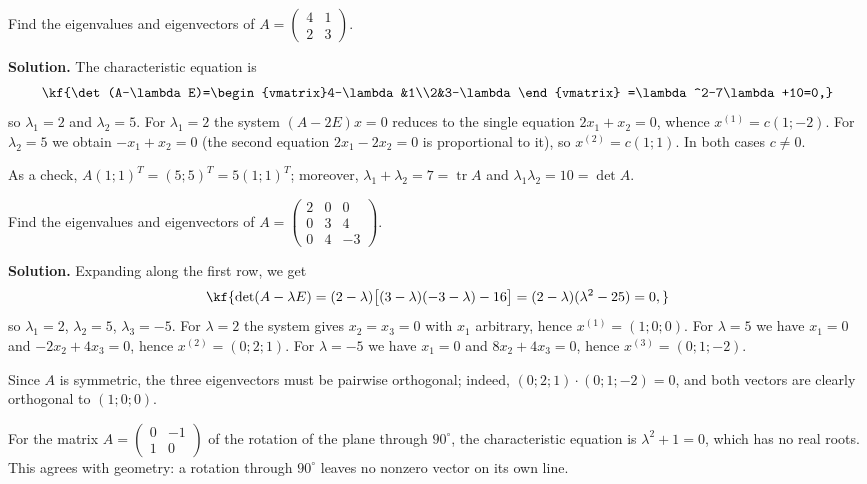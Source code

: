 \begin{misol}
Find the eigenvalues and eigenvectors of
$A=\begin{pmatrix}4&1\\2&3\end{pmatrix}$.

\textbf{Solution.} The characteristic equation is
\[\kf{\det(A-\lambda E)=\begin{vmatrix}4-\lambda&1\\2&3-\lambda\end{vmatrix}
=\lambda^2-7\lambda+10=0,}\]
so $\lambda_1=2$ and $\lambda_2=5$. For $\lambda_1=2$ the system
$(A-2E)x=0$ reduces to the single equation $2x_1+x_2=0$, whence
$x^{(1)}=c(1;-2)$. For $\lambda_2=5$ we obtain $-x_1+x_2=0$ (the second
equation $2x_1-2x_2=0$ is proportional to it), so $x^{(2)}=c(1;1)$. In
both cases $c\neq0$.

As a check, $A(1;1)^T=(5;5)^T=5(1;1)^T$; moreover,
$\lambda_1+\lambda_2=7=\operatorname{tr}A$ and
$\lambda_1\lambda_2=10=\det A$.
\end{misol}

\begin{misol}
Find the eigenvalues and eigenvectors of
$A=\begin{pmatrix}2&0&0\\0&3&4\\0&4&-3\end{pmatrix}$.

\textbf{Solution.} Expanding along the first row, we get
\[\kf{\det(A-\lambda E)=(2-\lambda)\big[(3-\lambda)(-3-\lambda)-16\big]
=(2-\lambda)(\lambda^2-25)=0,}\]
so $\lambda_1=2$, $\lambda_2=5$, $\lambda_3=-5$. For $\lambda=2$ the
system gives $x_2=x_3=0$ with $x_1$ arbitrary, hence $x^{(1)}=(1;0;0)$.
For $\lambda=5$ we have $x_1=0$ and $-2x_2+4x_3=0$, hence
$x^{(2)}=(0;2;1)$. For $\lambda=-5$ we have $x_1=0$ and $8x_2+4x_3=0$,
hence $x^{(3)}=(0;1;-2)$.

Since $A$ is symmetric, the three eigenvectors must be pairwise
orthogonal; indeed, $(0;2;1)\cdot(0;1;-2)=0$, and both vectors are
clearly orthogonal to $(1;0;0)$.
\end{misol}

\begin{misol}
For the matrix $A=\begin{pmatrix}0&-1\\1&0\end{pmatrix}$ of the rotation
of the plane through $90^\circ$, the characteristic equation is
$\lambda^2+1=0$, which has no real roots. This agrees with geometry: a
rotation through $90^\circ$ leaves no nonzero vector on its own line.
\end{misol}

